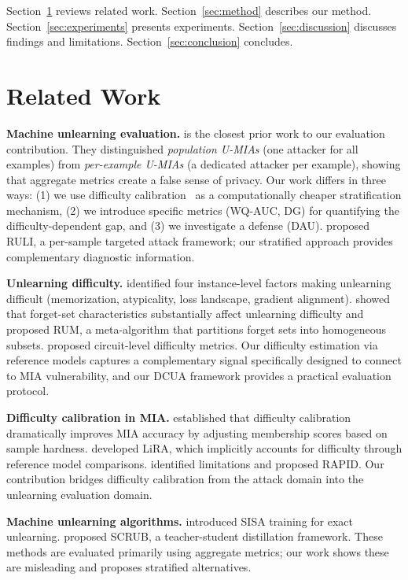 \documentclass{article}
\begin{document}
Section~\ref{sec:related} reviews related work. Section~\ref{sec:method} describes our method. Section~\ref{sec:experiments} presents experiments. Section~\ref{sec:discussion} discusses findings and limitations. Section~\ref{sec:conclusion} concludes.

\section{Related Work}
\label{sec:related}

\textbf{Machine unlearning evaluation.}
\citet{hayes2025inexact} is the closest prior work to our evaluation contribution.
They distinguished \emph{population U-MIAs} (one attacker for all examples) from \emph{per-example U-MIAs} (a dedicated attacker per example), showing that aggregate metrics create a false sense of privacy.
Our work differs in three ways: (1) we use difficulty calibration~\citep{watson2022importance} as a computationally cheaper stratification mechanism, (2) we introduce specific metrics (WQ-AUC, DG) for quantifying the difficulty-dependent gap, and (3) we investigate a defense (DAU).
\citet{naderloui2025rectifying} proposed RULI, a per-sample targeted attack framework; our stratified approach provides complementary diagnostic information.

\textbf{Unlearning difficulty.}
\citet{rizwan2024instance} identified four instance-level factors making unlearning difficult (memorization, atypicality, loss landscape, gradient alignment).
\citet{zhao2024what} showed that forget-set characteristics substantially affect unlearning difficulty and proposed RUM, a meta-algorithm that partitions forget sets into homogeneous subsets.
\citet{cheng2026toward} proposed circuit-level difficulty metrics.
Our difficulty estimation via reference models captures a complementary signal specifically designed to connect to MIA vulnerability, and our DCUA framework provides a practical evaluation protocol.

\textbf{Difficulty calibration in MIA.}
\citet{watson2022importance} established that difficulty calibration dramatically improves MIA accuracy by adjusting membership scores based on sample hardness.
\citet{carlini2022membership} developed LiRA, which implicitly accounts for difficulty through reference model comparisons.
\citet{he2024difficulty} identified limitations and proposed RAPID.
Our contribution bridges difficulty calibration from the attack domain into the unlearning evaluation domain.

\textbf{Machine unlearning algorithms.}
\citet{bourtoule2021machine} introduced SISA training for exact unlearning.
\citet{kurmanji2023towards} proposed SCRUB, a teacher-student distillation framework.
These methods are evaluated primarily using aggregate metrics; our work shows these are misleading and proposes stratified alternatives.
\end{document}
